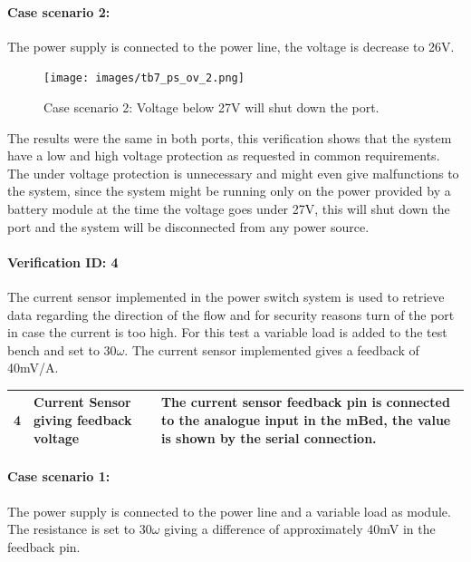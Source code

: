 \paragraph{Case scenario 2:} The power supply is connected to the power line, the voltage is decrease to 26V.

\begin{figure}[H]
	\begin{centering}
		\texttt{[image: images/tb7\_ps\_ov\_2.png]}
		\caption{Case scenario 2: Voltage below 27V will shut down the port.}
	\end{centering}
\end{figure}

The results were the same in both ports, this verification shows that the system have a low and high voltage protection as requested in common requirements. The under voltage protection is unnecessary and might even give malfunctions to the system, since the system might be running only on the power provided by a battery module at the time the voltage goes under 27V, this will shut down the port and the system will be disconnected from any power source. 

\paragraph{Verification ID: 4}
The current sensor implemented in the power switch system is used to retrieve data regarding the direction of the flow and for security reasons turn of the port in case the current is too high. For this test a variable load is added to the test bench and set to 30$\omega$. The current sensor implemented gives a feedback of 40mV/A.

\begin{table}[H]
\centering
	\begin{tabular}{| c | l | p{7cm} | }
		\hline
		4 & Current Sensor giving feedback voltage & The current sensor feedback pin is connected to the analogue input in the mBed, the value is shown by the serial connection. \\\hline
	\end{tabular}
\end{table}

\paragraph{Case scenario 1:} The power supply is connected to the power line and a variable load as module. The resistance is set to 30$\omega$ giving a difference of approximately 40mV in the feedback pin.

